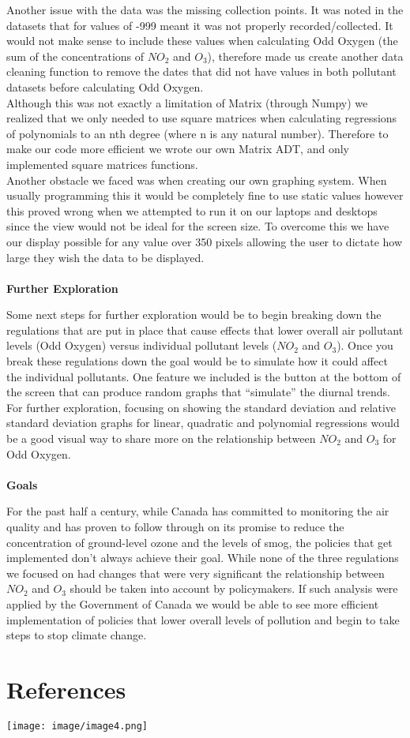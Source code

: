 \documentclass[fontsize=11pt]{article}
\begin{document}
Another issue with the data was the missing collection points. It was noted in the datasets that for values of -999 meant it was not properly recorded/collected. It would not make sense to include these values when calculating Odd Oxygen (the sum of the concentrations of $NO_2$ and $O_3$), therefore made us create another data cleaning function to remove the dates that did not have values in both pollutant datasets before calculating Odd Oxygen.\\

Although this was not exactly a limitation of Matrix (through Numpy) we realized that we only needed to use square matrices when calculating regressions of polynomials to an nth degree (where n is any natural number). Therefore to make our code more efficient we wrote our own Matrix ADT, and only implemented square matrices functions.\\

Another obstacle we faced was when creating our own graphing system. When usually programming this it would be completely fine to use static values however this proved wrong when we attempted to run it on our laptops and desktops since the view would not be ideal for the screen size. To overcome this we have our display possible for any value over 350 pixels allowing the user to dictate how large they wish the data to be displayed.\\ \\ \textbf{Further Exploration}

Some next steps for further exploration would be to begin breaking down the regulations that are put in place that cause effects that lower overall air pollutant levels (Odd Oxygen) versus individual pollutant levels ($NO_2$ and $O_3$). Once you break these regulations down the goal would be to simulate how it could affect the individual pollutants. One feature we included is the button at the bottom of the screen that can produce random graphs that “simulate” the diurnal trends.\\

For further exploration, focusing on showing the standard deviation and relative standard deviation graphs for linear, quadratic and polynomial regressions would be a good visual way to share more on the relationship between $NO_2$ and $O_3$ for Odd Oxygen.\\ \\ \textbf{Goals}

For the past half a century, while Canada has committed to monitoring the air quality and has proven to follow through on its promise to reduce the concentration of ground-level ozone and the levels of smog, the policies that get implemented don’t always achieve their goal. While none of the three regulations we focused on had changes that were very significant the relationship between $NO_2$ and $O_3$ should be taken into account by policymakers. If such analysis were applied by the Government of Canada we would be able to see more efficient implementation of policies that lower overall levels of pollution and begin to take steps to stop climate change.


\section*{References}

\texttt{[image: image/image4.png]} \\
\end{document}
